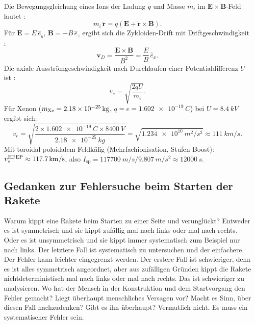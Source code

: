 ﻿\documentclass[a4paper,12pt,twoside]{article}
\theoremstyle{plain}
\theoremstyle{definition}
\theoremstyle{remark}
\newcommand{\Isp}{I_{\mathrm{sp}}}
\newcommand{\ve}{v_e}
\begin{document}
	Die Bewegungsgleichung eines Ions der Ladung $q$ und Masse $m_i$ im
	$\mathbf{E}\times\mathbf{B}$-Feld lautet \cite{stuhlinger1964, lieberman2005}:
	\begin{equation}
		m_i\,\ddot{\mathbf{r}} = q(\mathbf{E} + \dot{\mathbf{r}}\times\mathbf{B}).
		\label{eq:lorentz}
	\end{equation}
	Für $\mathbf{E} = E\,\hat{e}_y$, $\mathbf{B} = -B\,\hat{e}_z$ ergibt sich die
	Zykloiden-Drift mit Driftgeschwindigkeit \cite{zhurin1999, morozov2003}:
	\begin{equation}
		\mathbf{v}_D = \frac{\mathbf{E}\times\mathbf{B}}{B^2}
		= \frac{E}{B}\,\hat{e}_x.
		\label{eq:exb_drift}
	\end{equation}
	Die axiale Ausströmgeschwindigkeit nach Durchlaufen einer Potentialdifferenz $U$ ist
	\cite{goebel2008, jahn1968}:
	\begin{equation}
		\ve = \sqrt{\frac{2qU}{m_i}}.
		\label{eq:exhaust_velocity}
	\end{equation}
	Für Xenon ($m_{\rm Xe} = \SI{2.18e-25}{kg}$, $q = e = \SI{1.602e-19}{C}$)
	bei $U = \SI{8.4}{kV}$ ergibt sich:
	\begin{equation}
		\ve = \sqrt{\frac{2\times\SI{1.602e-19}{C}\times\SI{8400}{V}}{\SI{2.18e-25}{kg}}}
		= \sqrt{\SI{1.234e10}{m^2/s^2}}
		\approx \SI{111}{km/s}.
		\label{eq:ve_xe}
	\end{equation}
	Mit toroidal-poloidalem Feldkäfig (Mehrfachionisation, Stufen-Boost):
	$\ve^{\rm HFEP} \approx \SI{117.7}{km/s}$, also $\Isp = \SI{117700}{m/s}/\SI{9.807}{m/s^2}
	\approx \SI{12000}{s}$.
	
	\subsection{Gedanken zur Fehlersuche beim Starten der Rakete}
	Warum kippt eine Rakete beim Starten zu einer Seite und verunglückt? Entweder es ist symmetrisch und sie kippt zufällig mal nach links oder mal nach rechts. Oder es ist unsymmetrisch und sie kippt immer systematisch zum Beispiel nur nach links. Der letztere Fall ist systematisch zu untersuchen und der einfachere. Der Fehler kann leichter eingegrenzt werden. Der erstere Fall ist schwieriger, denn es ist alles symmetrisch angeordnet, aber aus zufälligen Gründen kippt die Rakete nichtdeterministisch mal nach links oder mal nach rechts. Das ist schwieriger zu analysieren. Wo hat der Mensch in der Konstruktion und dem Startvorgang den Fehler gemacht? Liegt überhaupt menschliches Versagen vor? Macht es Sinn, über diesen Fall nachzudenken? Gibt es ihn überhaupt? Vermutlich nicht. Es muss ein systematischer Fehler sein.
	
\end{document}
